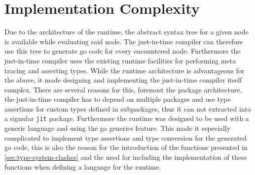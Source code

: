 \section{Implementation Complexity}

Due to the architecture of the runtime, the abstract syntax tree for a given
node is available while evaluating said node. The just-in-time compiler can
therefore use this tree to generate go code for every encountered node.
Furthermore the just-in-time compiler uses the existing runtime facilities for
performing meta tracing and asserting types. While the runtime architecture is
advantageous for the above, it made designing and implementing the just-in-time
compiler itself complex. There are several reasons for this, foremost the
package architecture, the just-in-time compiler has to depend on multiple
packages and use type assertions for custom types defined in subpackages, thus
it can not extracted into a signular \texttt{jit} package. Furthermore the
runtime was designed to be used with a generic language and using the go
generics feature. This made it especially complicated to implement type
assertions and type conversion for the generated go code, this is also the
reason for the introduction of the functions presented in
\autoref{sec:type-system-clashes} and the need for including the implementation
of these functions when defining a language for the runtime.
